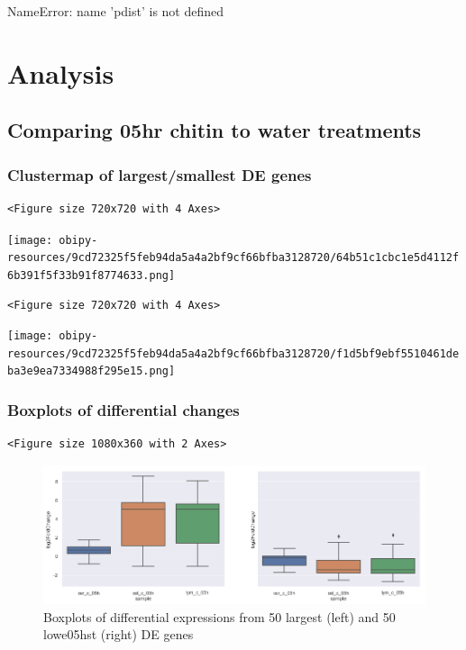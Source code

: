 \documentclass[a4paper]{article}
\begin{document}
NameError: name 'pdist' is not defined

\clearpage
\section{Analysis}
\label{sec:org38f601f}

\subsection{Comparing 05hr chitin to water treatments}
\label{sec:org0933277}

\subsubsection{Clustermap of largest/smallest DE genes}
\label{sec:org1618a07}
\begin{verbatim}
<Figure size 720x720 with 4 Axes>
\end{verbatim}

\begin{center}
\texttt{[image: obipy-resources/9cd72325f5feb94da5a4a2bf9cf66bfba3128720/64b51c1cbc1e5d4112f6b391f5f33b91f8774633.png]}
\end{center}

\begin{verbatim}
<Figure size 720x720 with 4 Axes>
\end{verbatim}

\begin{center}
\texttt{[image: obipy-resources/9cd72325f5feb94da5a4a2bf9cf66bfba3128720/f1d5bf9ebf5510461deba3e9ea7334988f295e15.png]}
\end{center}



\subsubsection{Boxplots of differential changes}
\label{sec:orgeedf0bb}

\begin{verbatim}
<Figure size 1080x360 with 2 Axes>
\end{verbatim}

\begin{figure}[htbp]
\centering
\includegraphics[width=.9\linewidth]{obipy-resources/pairings_05hr_boxplots.png}
\caption{\label{pairings_05hr_boxplots}
Boxplots of differential expressions from 50 largest (left) and 50 lowe05hst (right) DE genes}
\end{figure}
\end{document}
